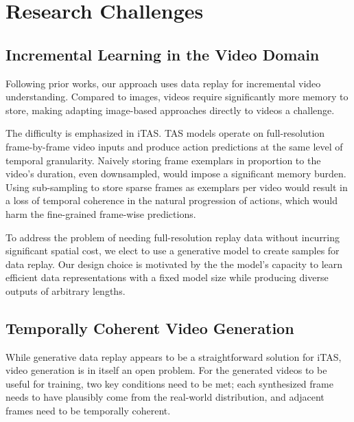 \section{Research Challenges}

\subsection{Incremental Learning in the Video Domain}
\label{sub:challenge_il_vid}


Following prior works, our approach uses data replay for incremental video understanding. Compared to images, videos require significantly more memory to store, making adapting image-based approaches directly to videos a challenge. 

The difficulty is emphasized in iTAS. TAS models operate on full-resolution frame-by-frame video inputs and produce action predictions at the same level of temporal granularity. Naively storing frame exemplars in proportion to the video's duration, even downsampled, would impose a significant memory burden. Using sub-sampling to store sparse frames as exemplars per video would result in a loss of temporal coherence in the natural progression of actions, which would harm the fine-grained frame-wise predictions.

To address the problem of needing full-resolution replay data without incurring significant spatial cost, we elect to use a generative model to create samples for data replay. Our design choice is motivated by the the model’s capacity to learn efficient data representations with a fixed model size while producing diverse outputs of arbitrary lengths.

\subsection{Temporally Coherent Video Generation}

While generative data replay appears to be a straightforward solution for iTAS, video generation is in itself an open problem. For the generated videos to be useful for training, two key conditions need to be met; each synthesized frame needs to have plausibly come from the real-world distribution, and adjacent frames need to be temporally coherent.  

